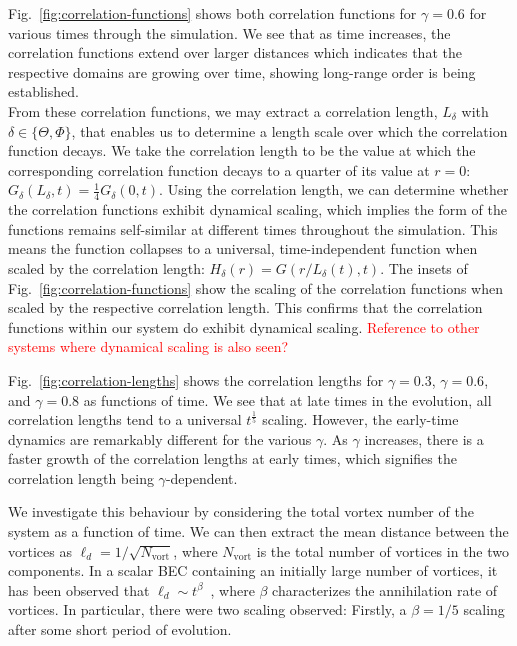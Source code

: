 Fig.~\ref{fig:correlation-functions} shows both correlation functions for
$\gamma=0.6$ for various times through the simulation.
We see that as time increases, the correlation functions extend over larger
distances which indicates that the respective domains are growing over time,
showing long-range order is being established.\\
From these correlation functions, we may extract a correlation length, $L_\delta$
with $\delta \in \{\Theta, \Phi\}$, that enables us to determine a length scale
over which the correlation function decays.
We take the correlation length to be the value at which the corresponding
correlation function decays to a quarter of its value at
$r=0$: $G_\delta(L_\delta, t) = \frac{1}{4}G_\delta(0, t)$.
Using the correlation length, we can determine whether the correlation functions
exhibit dynamical scaling, which implies the form of the functions remains
self-similar at different times throughout the simulation.
This means the function collapses to a universal, time-independent function
when scaled by the correlation length: $H_\delta(r) = G(r/L_\delta(t), t)$.
The insets of Fig.~\ref{fig:correlation-functions} show the scaling of the
correlation functions when scaled by the respective correlation length.
This confirms that the correlation functions within our system do exhibit
dynamical scaling. \textcolor{red}{Reference to other systems where dynamical
scaling is also seen?} \par
Fig.~\ref{fig:correlation-lengths} shows the correlation lengths for
$\gamma=0.3$, $\gamma=0.6$, and $\gamma=0.8$ as functions of time.
We see that at late times in the evolution, all correlation lengths tend to a
universal $t^\frac{1}{5}$ scaling.
However, the early-time dynamics are remarkably different for the various
$\gamma$.
As $\gamma$ increases, there is a faster growth of the correlation lengths at
early times, which signifies the correlation length being $\gamma$-dependent.
\par
We investigate this behaviour by considering the total vortex number of
the system as a function of time.
We can then extract the mean distance between the vortices as
$\ell_d=1/\sqrt{N_\mathrm{vort}}$, where $N_\mathrm{vort}$ is the total number
of vortices in the two components.
In a scalar BEC containing an initially large number of vortices, it has been
observed that $\ell_d \sim t^\beta$~\cite{Karl2017}, where $\beta$ characterizes
the annihilation rate of vortices.
In particular, there were two scaling observed: Firstly, a $\beta=1/5$ scaling
after some short period of evolution.
